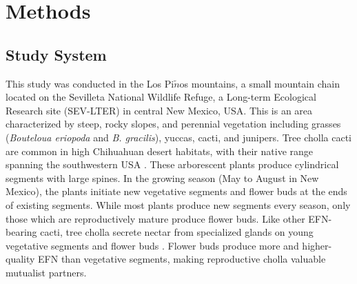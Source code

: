 \documentclass[11pt]{article}
\begin{document}
\section*{Methods}
\subsection*{Study System}
  
This study was conducted in the Los Pi$\tilde{n}$os mountains, a small mountain chain located on the Sevilleta National Wildlife Refuge, a Long-term Ecological Research site (SEV-LTER) in central New Mexico, USA.
This is an area characterized by steep, rocky slopes, and perennial vegetation including grasses (\textit{Bouteloua eriopoda} and \textit{B. gracilis}), yuccas, cacti, and junipers. 
Tree cholla cacti are common in high Chihuahuan desert habitats, with their native range spanning the southwestern USA \citep{Benson1982}. 
These arborescent plants produce cylindrical segments with large spines. 
In the growing season (May to August in New Mexico), the plants initiate new vegetative segments and flower buds at the ends of existing segments. 
While most plants produce new segments every season, only those which are reproductively mature produce flower buds. 
Like other EFN-bearing cacti, tree cholla secrete nectar from specialized glands on young vegetative segments and flower buds \citep{Ness2006,Oliveira1999}. 
Flower buds produce more and higher-quality EFN than vegetative segments, making reproductive cholla valuable mutualist partners. 
\end{document}
